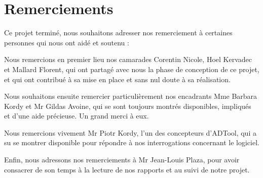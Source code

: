 \section{Remerciements}

Ce projet terminé, nous souhaitons adresser nos remerciement à certaines personnes qui nous ont aidé et soutenu :   

Nous remercions en premier lieu nos camarades Corentin Nicole, Hoel Kervadec et Mallard Florent, qui ont partagé avec nous la phase de conception de ce projet, et qui ont contribué à sa mise en place et sans nul doute à sa réalisation.

Nous souhaitons ensuite remercier particulièrement nos encadrants Mme Barbara Kordy et Mr Gildas Avoine, qui se sont toujours montrés disponibles, impliqués et d'une aide précieuse. Un grand merci à eux.

Nous remercions vivement Mr Piotr Kordy, l'un des concepteurs d'ADTool, qui a su se montrer disponible pour répondre à nos interrogations concernant le logiciel.

Enfin, nous adressons nos remerciements à Mr Jean-Louis Plaza, pour avoir consacrer de son temps à la lecture de nos rapports et au suivi de notre projet.